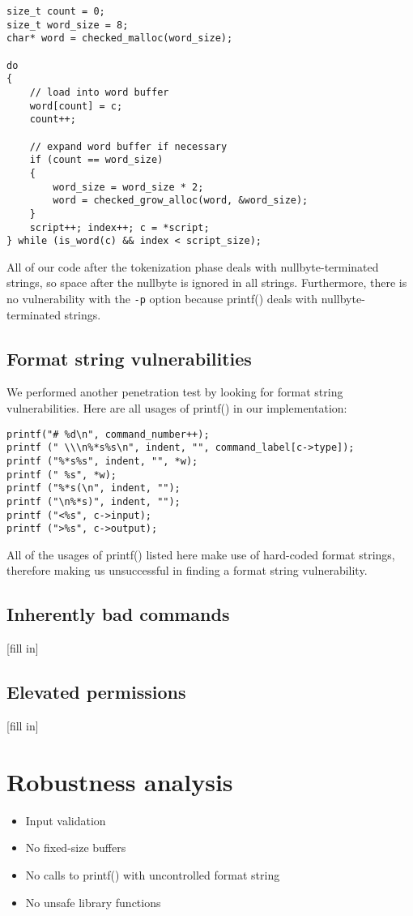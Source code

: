\documentclass[12pt]{article}
\begin{document}
\begin{lstlisting}[frame=single]
size_t count = 0;
size_t word_size = 8;
char* word = checked_malloc(word_size);

do
{
    // load into word buffer
    word[count] = c;
    count++;

    // expand word buffer if necessary
    if (count == word_size)
    {
        word_size = word_size * 2;
        word = checked_grow_alloc(word, &word_size);
    }
    script++; index++; c = *script;
} while (is_word(c) && index < script_size);
\end{lstlisting}

All of our code after the tokenization phase deals with nullbyte-terminated strings, so space after the nullbyte is ignored in all strings. Furthermore, there is no vulnerability with the \texttt{-p} option because printf() deals with nullbyte-terminated strings.

\subsection{Format string vulnerabilities}

We performed another penetration test by looking for format string vulnerabilities. Here are all usages of printf() in our implementation:

\begin{lstlisting}[frame=single]
printf("# %d\n", command_number++);
printf (" \\\n%*s%s\n", indent, "", command_label[c->type]);
printf ("%*s%s", indent, "", *w);
printf (" %s", *w);
printf ("%*s(\n", indent, "");
printf ("\n%*s)", indent, "");
printf ("<%s", c->input);
printf (">%s", c->output);
\end{lstlisting}

All of the usages of printf() listed here make use of hard-coded format strings, therefore making us unsuccessful in finding a format string vulnerability.

\subsection{Inherently bad commands}
[fill in]

\subsection{Elevated permissions}
[fill in]

\section{Robustness analysis}
\begin{itemize}
  \item Input validation
  \item No fixed-size buffers
  \item No calls to printf() with uncontrolled format string
  \item No unsafe library functions
\end{itemize}
\end{document}

